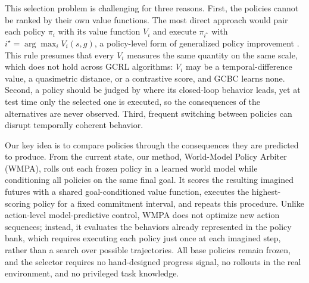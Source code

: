 \documentclass{article}
\theoremstyle{plain}
\theoremstyle{definition}
\theoremstyle{plain}
\newcommand{\wmpa}{\textsc{WMPA}}
\begin{document}
This selection problem is challenging for three reasons.
First, the policies cannot be ranked by their own value functions.
The most direct approach would pair each policy $\pi_i$ with its value function $V_i$ and execute $\pi_{i^\star}$ with $i^\star = \arg\max_i V_i(s, g)$, a policy-level form of generalized policy improvement \citep{barreto2017successor}.
This rule presumes that every $V_i$ measures the same quantity on the same scale, which does not hold across GCRL algorithms: $V_i$ may be a temporal-difference value, a quasimetric distance, or a contrastive score, and GCBC learns none.
Second, a policy should be judged by where its closed-loop behavior leads, yet at test time only the selected one is executed, so the consequences of the alternatives are never observed.
Third, frequent switching between policies can disrupt temporally coherent behavior.

Our key idea is to compare policies through the consequences they are predicted to produce. From the current state, our method, World-Model Policy Arbiter (\wmpa), rolls out each frozen policy in a learned world model while conditioning all policies on the same final goal. It scores the resulting imagined futures with a shared goal-conditioned value function, executes the highest-scoring policy for a fixed commitment interval, and repeats this procedure. Unlike action-level model-predictive control, \wmpa{} does not optimize new action sequences; instead, it evaluates the behaviors already represented in the policy bank, which requires executing each policy just once at each imagined step, rather than a search over possible trajectories. All base policies remain frozen, and the selector requires no hand-designed progress signal, no rollouts in the real environment, and no privileged task knowledge.
\end{document}

